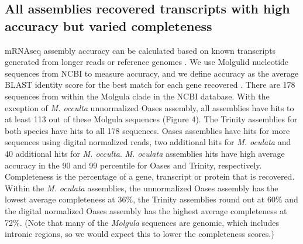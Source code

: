 \subsection{All assemblies recovered transcripts with high accuracy but varied completeness}
mRNAseq assembly accuracy can be calculated based on known transcripts generated from longer reads or reference genomes \citep{vijay_challenges_2012,martin_next-generation_2011}. We use Molgulid nucleotide sequences from NCBI to measure accuracy, and we define accuracy as the average BLAST identity score for the best match for each gene recovered \citep{li_sequence_2009}. There are 178 sequences from within the Molgula clade in the NCBI database. With the exception of \textit{M. occulta} unnormalized Oases assembly, all assemblies have hits to at least 113 out of these Molgula sequences (Figure 4). The Trinity assemblies for both species have hits to all 178 sequences. Oases assemblies have hits for more sequences using digital normalized reads, two additional hits for \textit{M. oculata} and 40 additional hits for \textit{M. occulta}. \textit{M. oculata} assemblies hits have high average accuracy in the 90 and 99 percentile for Oases and Trinity, respectively. Completeness is the percentage of a gene, transcript or protein that is recovered. Within the \textit{M. oculata} assemblies, the unnormalized Oases assembly has the lowest average completeness at 36\%, the Trinity assemblies round out at 60\% and the digital normalized Oases assembly has the highest average completeness at 72\%.  (Note that many of the \textit{Molgula} sequences are genomic, which includes intronic regions, so we would expect this to lower the completeness scores.)
	

